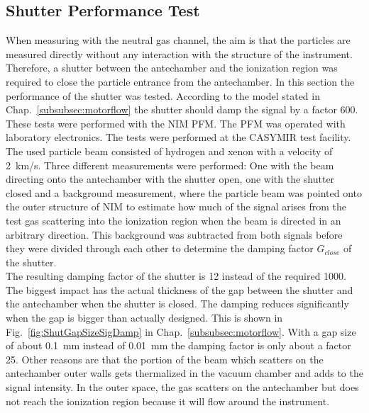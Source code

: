 	\subsection{Shutter Performance Test }
	When measuring with the neutral gas channel, the aim is that the particles are measured directly without any interaction with the structure of the instrument. Therefore, a shutter between the antechamber and the ionization region was required to close the particle entrance from the antechamber. In this section the performance of the shutter was tested. According to the model stated in Chap.~\ref{subsubsec:motorflow} the shutter should damp the signal by a factor 600.\\
	These tests were performed with the NIM PFM. The PFM was operated with laboratory electronics. The tests were performed at the CASYMIR test facility. The used particle beam consisted of hydrogen and xenon with a velocity of 2~km/s. Three different measurements were performed: One with the beam directing onto the antechamber with the shutter open, one with the shutter closed and a background measurement, where the particle beam was pointed onto the outer structure of NIM to estimate how much of the signal arises from the test gas scattering into the ionization region when the beam is directed in an arbitrary direction. This background was subtracted from both signals before they were divided through each other to determine the damping factor $G_{close}$ of the shutter.\\
	The resulting damping factor of the shutter is 12 instead of the required 1000. The biggest impact has the actual thickness of the gap between the shutter and the antechamber when the shutter is closed. The damping reduces significantly when the gap is bigger than actually designed. This is shown in Fig.~\ref{fig:ShutGapSizeSigDamp} in Chap.~\ref{subsubsec:motorflow}. With a gap size of about 0.1~mm instead of 0.01~mm the damping factor is only about a factor 25. Other reasons are that the portion of the beam which scatters on the antechamber outer walls gets thermalized in the vacuum chamber and adds to the signal intensity. In the outer space, the gas scatters on the antechamber but does not reach the ionization region because it will flow around the instrument.
	
